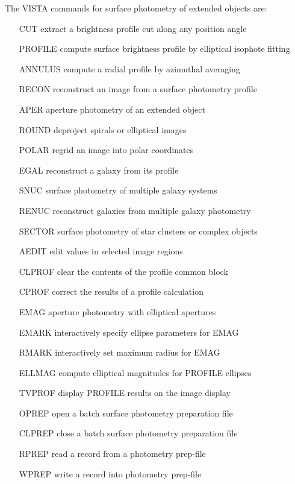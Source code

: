 The VISTA commands for surface photometry of extended objects are:
\begin{itemize}
  \item[CUT\hfill]{extract a brightness profile cut along any position angle}
  \item[PROFILE\hfill]{compute surface brightness profile by elliptical
       isophote fitting}
  \item[ANNULUS\hfill]{compute a radial profile by azimuthal averaging}
  \item[RECON\hfill]{reconstruct an image from a surface photometry profile}
  \item[APER\hfill]{aperture photometry of an extended object}
  \item[ROUND\hfill]{deproject spirals or elliptical images}
  \item[POLAR\hfill]{regrid an image into polar coordinates}
  \item[EGAL\hfill]{reconstruct a galaxy from its profile}
  \item[SNUC\hfill]{surface photometry of multiple galaxy systems}
  \item[RENUC\hfill]{reconstruct galaxies from multiple galaxy photometry}
  \item[SECTOR\hfill]{surface photometry of star clusters or complex
       objects} 
  \item[AEDIT\hfill]{edit values in selected image regions}
  \item[CLPROF\hfill]{clear the contents of the profile common block}
  \item[CPROF\hfill]{correct the results of a profile calculation}
  \item[EMAG\hfill]{aperture photometry with elliptical apertures}
  \item[EMARK\hfill]{interactively specify ellipse parameters for EMAG} 
  \item[RMARK\hfill]{interactively set maximum radius for EMAG}
  \item[ELLMAG\hfill]{compute elliptical magnitudes for PROFILE ellipses}
  \item[TVPROF\hfill]{display PROFILE results on the image display}
  \item[OPREP\hfill]{open a batch surface photometry preparation file}
  \item[CLPREP\hfill]{close a batch surface photometry preparation file}
  \item[RPREP\hfill]{read a record from a photometry prep-file}
  \item[WPREP\hfill]{write a record into photometry prep-file}
\end{itemize}

